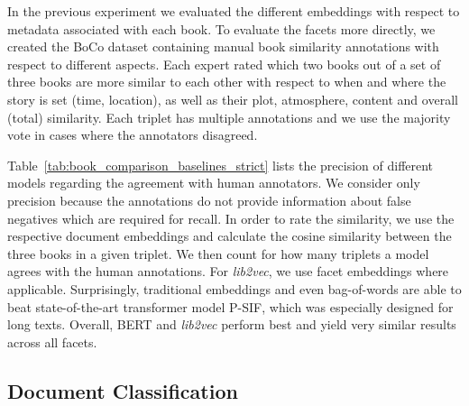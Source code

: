 \documentclass[11pt]{article}
\begin{document}
In the previous experiment we evaluated the different embeddings with respect to metadata associated with each book.
To evaluate the facets more directly, we created the BoCo dataset containing manual book similarity annotations with respect to different aspects.
Each expert rated which two books out of a set of three books are more similar to each other with respect to when and where the story is set (time, location), as well as their plot, atmosphere, content and overall (total) similarity.
Each triplet has multiple annotations and we use the majority vote in cases where the annotators disagreed.

Table~\ref{tab:book_comparison_baselines_strict} lists the precision of different models regarding the agreement with human annotators.
We consider only precision because the annotations do not provide information about false negatives which are required for recall.
In order to rate the similarity, we use the respective document embeddings and calculate the cosine similarity between the three books in a given triplet.
We then count for how many triplets a model agrees with the human annotations.
For \emph{lib2vec}, we use facet embeddings where applicable.
Surprisingly, traditional embeddings and even bag-of-words are able to beat state-of-the-art transformer model P-SIF, which was especially designed for long texts.
Overall, BERT and \emph{lib2vec} perform best and yield very similar results across all facets.

\subsection{Document Classification}
\end{document}
